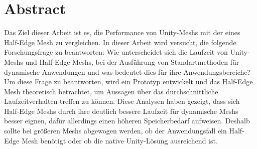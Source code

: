 \section{Abstract}
Das Ziel dieser Arbeit ist es, die Performance von Unity-Meshs mit der eines Half-Edge Mesh zu vergleichen. In dieser Arbeit wird versucht, die folgende Forschungsfrage zu beantworten: Wie unterscheidet sich die Laufzeit von Unity-Meshs und Half-Edge Meshs, bei der Ausf\"uhrung von Standartmethoden f\"ur dynamische Anwendungen und was bedeutet dies f\"ur ihre Anwendungsbereiche?
Um diese Frage zu beantworten, wird ein Prototyp entwickelt und das Half-Edge Mesh theoretisch betrachtet, um Aussagen \"uber das durchschnittliche Laufzeitverhalten treffen zu k\"onnen.
Diese Analysen haben gezeigt, dass sich Half-Edge Meshs durch ihre deutlich bessere Laufzeit f\"ur dynamische Meshs besser eignen, daf\"ur allerdings einen h\"oheren Speicherbedarf aufweisen. Deshalb sollte bei gr\"o{\ss}eren Meshs abgewogen werden, ob der Anwendungsfall ein Half-Edge Mesh ben\"otigt oder ob die native Unity-L\"osung ausreichend ist.